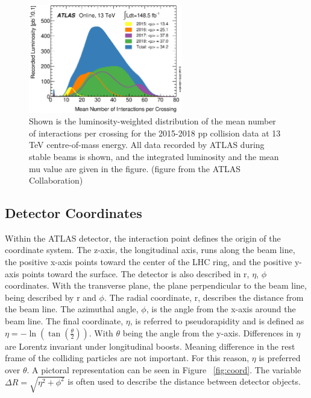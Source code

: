 \begin{figure}[H]
\begin{center}
\includegraphics*[width=0.60\textwidth] {figures/mu_2015_2018}%
\caption[Number of interactions per bunch crossing]{Shown is the luminosity-weighted distribution of the mean number of interactions per crossing for the 2015-2018 pp collision data at 13 TeV centre-of-mass energy. All data recorded by ATLAS during stable beams is shown, and the integrated luminosity and the mean mu value are given in the figure. (figure from the ATLAS Collaboration)}
\label{fig:mu}
\end{center}
\end{figure}

\subsection{Detector Coordinates}
Within the ATLAS detector, the interaction point defines the origin of the coordinate system. The z-axis, the longitudinal axis, runs along the beam line, the positive x-axis points toward the center of the LHC ring, and the positive y-axis points toward the surface. The detector is also described in r, ${\eta}$, ${\phi}$ coordinates. With the transverse plane, the plane perpendicular to the beam line, being described by r and ${\phi}$. The radial coordinate, r, describes the distance from the beam line. The azimuthal angle, ${\phi}$, is the angle from the x-axis around the beam line. The final coordinate, ${\eta}$, is referred to pseudorapidity and is defined as ${\eta = -\ln(\tan(\frac{\theta}{2}))}$. With ${\theta}$ being the angle from the y-axis. Differences in ${\eta}$ are Lorentz invariant under longitudinal boosts. Meaning difference in the rest frame of the colliding particles are not important. For this reason, ${\eta}$ is preferred over ${\theta}$. A pictoral representation can be seen in Figure ~\ref{fig:coord}. The variable ${\Delta{R}=\sqrt{\eta^{2} + \phi^{2}}}$ is often used to describe the distance between detector objects.

